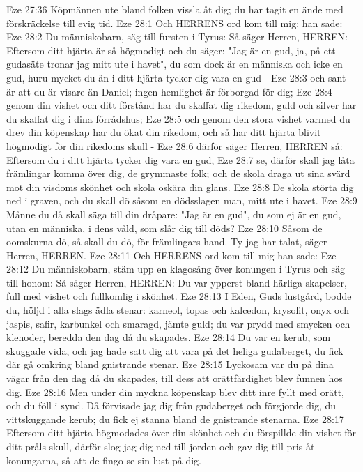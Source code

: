 Eze 27:36  Köpmännen ute bland folken vissla åt dig; du har tagit en ände med förskräckelse till evig tid.
Eze 28:1  Och HERRENS ord kom till mig; han sade:
Eze 28:2  Du människobarn, säg till fursten i Tyrus: Så säger Herren, HERREN: Eftersom ditt hjärta är så högmodigt och du säger: "Jag är en gud, ja, på ett gudasäte tronar jag mitt ute i havet", du som dock är en människa och icke en gud, huru mycket du än i ditt hjärta tycker dig vara en gud -
Eze 28:3  och sant är att du är visare än Daniel; ingen hemlighet är förborgad för dig;
Eze 28:4  genom din vishet och ditt förstånd har du skaffat dig rikedom, guld och silver har du skaffat dig i dina förrådshus;
Eze 28:5  och genom den stora vishet varmed du drev din köpenskap har du ökat din rikedom, och så har ditt hjärta blivit högmodigt för din rikedoms skull -
Eze 28:6  därför säger Herren, HERREN så: Eftersom du i ditt hjärta tycker dig vara en gud,
Eze 28:7  se, därför skall jag låta främlingar komma över dig, de grymmaste folk; och de skola draga ut sina svärd mot din visdoms skönhet och skola oskära din glans.
Eze 28:8  De skola störta dig ned i graven, och du skall dö såsom en dödsslagen man, mitt ute i havet.
Eze 28:9  Månne du då skall säga till din dråpare: "Jag är en gud", du som ej är en gud, utan en människa, i dens våld, som slår dig till döds?
Eze 28:10  Såsom de oomskurna dö, så skall du dö, för främlingars hand. Ty jag har talat, säger Herren, HERREN.
Eze 28:11  Och HERRENS ord kom till mig han sade:
Eze 28:12  Du människobarn, stäm upp en klagosång över konungen i Tyrus och säg till honom: Så säger Herren, HERREN: Du var ypperst bland härliga skapelser, full med vishet och fullkomlig i skönhet.
Eze 28:13  I Eden, Guds lustgård, bodde du, höljd i alla slags ädla stenar: karneol, topas och kalcedon, krysolit, onyx och jaspis, safir, karbunkel och smaragd, jämte guld; du var prydd med smycken och klenoder, beredda den dag då du skapades.
Eze 28:14  Du var en kerub, som skuggade vida, och jag hade satt dig att vara på det heliga gudaberget, du fick där gå omkring bland gnistrande stenar.
Eze 28:15  Lyckosam var du på dina vägar från den dag då du skapades, till dess att orättfärdighet blev funnen hos dig.
Eze 28:16  Men under din myckna köpenskap blev ditt inre fyllt med orätt, och du föll i synd. Då förvisade jag dig från gudaberget och förgjorde dig, du vittskuggande kerub; du fick ej stanna bland de gnistrande stenarna.
Eze 28:17  Eftersom ditt hjärta högmodades över din skönhet och du förspillde din vishet för ditt pråls skull, därför slog jag dig ned till jorden och gav dig till pris åt konungarna, så att de fingo se sin lust på dig.
